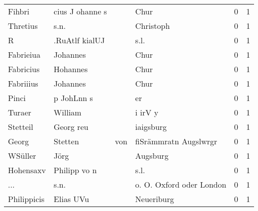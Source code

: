 \documentclass[10pt,a4paper,landscape]{article}
\begin{document}
\begin{longtable}{llllrr}
                   Fihbri &                    cius J ohanne s &             &                                        Chur &          0 &         1 \\
                 Thretius &                               s.n. &             &                                   Christoph &          0 &         1 \\
                        R &                     .RuAtlf kialUJ &             &                                        s.l. &          0 &         1 \\
                Fabrieiua &                           Johannes &             &                                        Chur &          0 &         1 \\
                Fabricius &                           Hohannes &             &                                        Chur &          0 &         1 \\
                Fabriiius &                           Johannes &             &                                        Chur &          0 &         1 \\
                    Pinci &                         p JohLnn s &             &                                          er &          0 &         1 \\
                   Turaer &                            William &             &                                     i irV y &          0 &         1 \\
                 Stetteil &                          Georg reu &             &                                   iaigsburg &          0 &         1 \\
                    Georg &                            Stetten &         von &                       fiSrämmratn Augslwrgr &          0 &         1 \\
                  WSüller &                               Jörg &             &                                    Augsburg &          0 &         1 \\
                Hohensaxv &                       Philipp vo n &             &                                        s.l. &          0 &         1 \\
                      ... &                               s.n. &             &                    o. O. Oxford oder London &          0 &         1 \\
              Philippicis &                          Elias UVu &             &                                  Neueriburg &          0 &         1 \\

\end{longtable}
\end{document}
